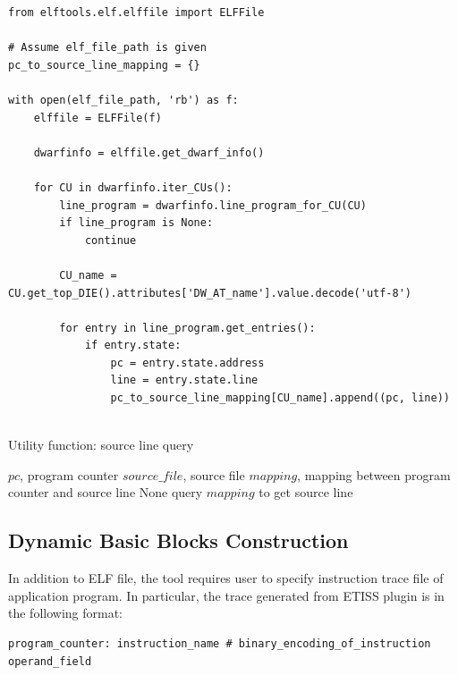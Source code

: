 \medskip
\begin{center}
\begin{minipage}{\textwidth}
\begin{lstlisting}
from elftools.elf.elffile import ELFFile

# Assume elf_file_path is given
pc_to_source_line_mapping = {}

with open(elf_file_path, 'rb') as f:
    elffile = ELFFile(f)

    dwarfinfo = elffile.get_dwarf_info()

    for CU in dwarfinfo.iter_CUs():
        line_program = dwarfinfo.line_program_for_CU(CU)
        if line_program is None:
            continue

        CU_name = CU.get_top_DIE().attributes['DW_AT_name'].value.decode('utf-8')

        for entry in line_program.get_entries():
            if entry.state:
                pc = entry.state.address
                line = entry.state.line
                pc_to_source_line_mapping[CU_name].append((pc, line))
                    

\end{lstlisting}
\end{minipage}
\end{center}

\medskip
\begin{algorithm}
\caption{Utility function: source line query}
\label{alg:query_source_line}
\begin{algorithmic}
\REQUIRE $pc$, program counter
\REQUIRE $source\_file$, source file
\REQUIRE $mapping$, mapping between program counter and source line
    \RETURN None
\ENDIF
\STATE query $mapping$ to get source line
\end{algorithmic}
\end{algorithm}

\subsection{Dynamic Basic Blocks Construction}
\label{sec:bb_construction}

In addition to ELF file, the tool requires user to specify instruction trace file of application program. In particular, the trace generated from ETISS plugin is in the following format:  

\medskip
\begin{lstlisting}
program_counter: instruction_name # binary_encoding_of_instruction operand_field    
\end{lstlisting}

